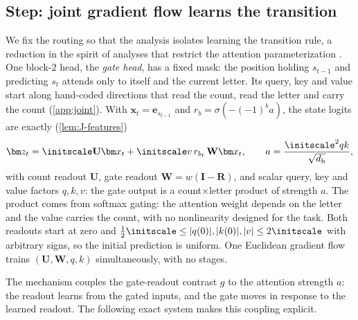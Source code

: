 \subsection{Step: joint gradient flow learns the transition}
\label{sec:step}
We fix the routing so that the analysis isolates learning the transition rule, a reduction in the spirit of analyses that restrict the
attention parameterization \citep{kim2024parity}. One block-$2$ head, the \emph{gate head}, has a fixed mask: the position holding $s_{t-1}$ and
predicting $s_t$ attends only to itself and the current letter. Its query, key and value start along hand-coded directions that read the
count, read the letter and carry the count (\cref{app:joint}). With $\bm x_t=\bm e_{s_{t-1}}$ and $r_b=\sigma(-(-1)^ba)$, the state logits are
exactly (\cref{lem:J-features})
\[
 \bm z_t=\initscale \mathbf U\bm x_t+\initscale v\,r_{b_t}\,\mathbf W\bm x_t,
 \qquad a=\frac{\initscale^2qk}{\sqrt{d_{\mathrm h}}},
\]
with count readout $\mathbf U$, gate readout $\mathbf W=w(\mathbf I-\mathbf R)$, and scalar query, key and value factors $q,k,v$: the gate output is
a count$\times$letter product of strength $a$. The product comes from softmax gating: the attention weight depends on the letter and the
value carries the count, with no nonlinearity designed for the task. Both readouts start at zero and $\frac12\initscale\le|q(0)|,|k(0)|,|v|\le2\initscale$ with arbitrary
signs, so the initial prediction is uniform. One Euclidean gradient flow trains $(\mathbf U,\mathbf W,q,k)$ simultaneously, with no stages.

The mechanism couples the gate-readout contrast $g$ to the attention strength $a$: the readout learns from the gated inputs,
and the gate moves in response to the learned readout. The following exact system makes this coupling explicit.

